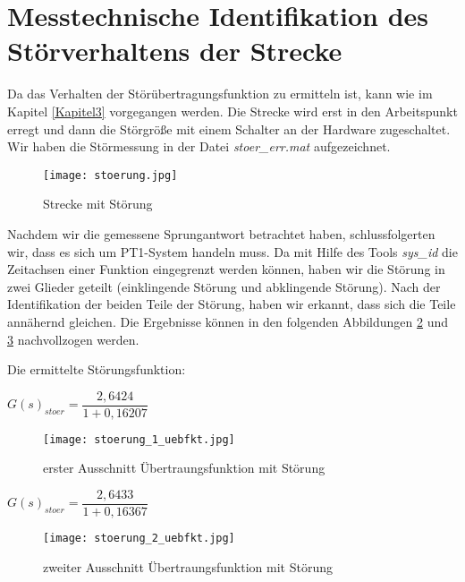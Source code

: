 
\newpage
[Perkowski]
\section{Messtechnische Identifikation des Störverhaltens der Strecke}\label{Kapitel4}
Da das Verhalten der Störübertragungsfunktion zu ermitteln ist, kann wie im Kapitel \ref{Kapitel3} vorgegangen werden. Die Strecke wird erst in den Arbeitspunkt erregt und dann die Störgröße mit einem Schalter an der Hardware zugeschaltet. Wir haben die Störmessung in der Datei \textit{stoer\_err.mat} aufgezeichnet.

\begin{figure}[h]
	\begin{center}
		\texttt{[image: stoerung.jpg]}
		\caption{Strecke mit Störung}
       \label{stoer}
	\end{center} 
\end{figure}

Nachdem wir die gemessene Sprungantwort betrachtet haben, schlussfolgerten wir, dass es sich um PT1-System handeln muss. 
Da mit Hilfe des Tools \textit{sys\_id} die Zeitachsen einer Funktion eingegrenzt werden können, haben wir die Störung in zwei Glieder geteilt (einklingende Störung und abklingende Störung). Nach der Identifikation der beiden Teile der Störung, haben wir erkannt, dass sich die Teile annähernd gleichen. Die Ergebnisse können in den folgenden Abbildungen \ref{stoerfkt1} und \ref{stoerfkt2} nachvollzogen werden.

\newpage

Die ermittelte Störungsfunktion:

\begin{center}
$ G(s)_{stoer} = \dfrac{2,6424}{1 + 0,16207} $
\end{center}

\begin{figure}[h]
	\begin{center}
		\texttt{[image: stoerung\_1\_uebfkt.jpg]}
		\caption{erster Ausschnitt Übertraungsfunktion mit Störung}
       \label{stoerfkt1}
	\end{center} 
\end{figure}

\begin{center}
$ G(s)_{stoer} = \dfrac{2,6433}{1 + 0,16367} $
\end{center}

\begin{figure}[h]
	\begin{center}
		\texttt{[image: stoerung\_2\_uebfkt.jpg]}
		\caption{zweiter Ausschnitt Übertraungsfunktion mit Störung}
       \label{stoerfkt2}
	\end{center} 
\end{figure}


